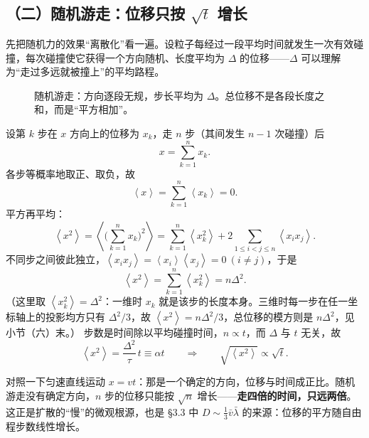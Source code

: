 \documentclass[11pt,a4paper,openany]{ctexbook}
\newcommand{\avg}[1]{\left\langle #1\right\rangle}
\begin{document}
\subsection*{（二）随机游走：位移只按 $\sqrt t$ 增长}
先把随机力的效果“离散化”看一遍。设粒子每经过一段平均时间就发生一次有效碰撞，每次碰撞使它获得一个方向随机、长度平均为 $\Delta$ 的位移——$\Delta$ 可以理解为“走过多远就被撞上”的平均路程。
\begin{figure}[!htbp]
\centering
{}
\caption{随机游走：方向逐段无规，步长平均为 $\Delta$。总位移不是各段长度之和，而是“平方相加”。}
\end{figure}
设第 $k$ 步在 $x$ 方向上的位移为 $x_k$，走 $n$ 步（其间发生 $n-1$ 次碰撞）后
\[
x=\sum_{k=1}^{n}x_k .
\]
各步等概率地取正、取负，故
\[
\avg{x}=\sum_{k=1}^{n}\avg{x_k}=0 .
\]
平方再平均：
\[
\avg{x^2}
=\left\langle\Big(\sum_{k=1}^{n}x_k\Big)^2\right\rangle
=\sum_{k=1}^{n}\avg{x_k^2}
+2\sum_{1\le i<j\le n}\avg{x_ix_j}.
\]
不同步之间彼此独立，$\avg{x_ix_j}=\avg{x_i}\avg{x_j}=0\ (i\neq j)$，于是
\[
\avg{x^2}=\sum_{k=1}^{n}\avg{x_k^2}=n\Delta^2 .
\]
（这里取 $\avg{x_k^2}=\Delta^2$：一维时 $x_k$ 就是该步的长度本身。三维时每一步在任一坐标轴上的投影均方只有 $\Delta^2/3$，故 $\avg{x^2}=n\Delta^2/3$，总位移的模方则是 $n\Delta^2$，见小节（六）末。）
步数是时间除以平均碰撞时间，$n\propto t$，而 $\Delta$ 与 $t$ 无关，故
\[
\avg{x^2}=\frac{\Delta^2}{\tau}\,t\equiv\alpha t
\qquad\Longrightarrow\qquad
\boxed{\sqrt{\avg{x^2}}\propto\sqrt t} .
\]
\begin{notebox}
对照一下匀速直线运动 $x=vt$：那是一个确定的方向，位移与时间成正比。随机游走没有确定方向，$n$ 步的位移只能按 $\sqrt n$ 增长——\textbf{走四倍的时间，只远两倍}。这正是扩散的“慢”的微观根源，也是 §3.3 中 $D\sim\frac13\bar v\bar\lambda$ 的来源：位移的平方随自由程步数线性增长。
\end{notebox}
\end{document}
